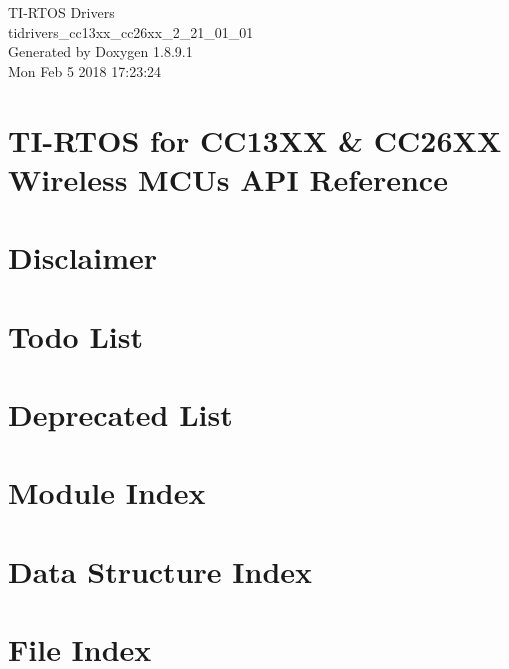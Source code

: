 \documentclass[twoside]{article}
\newcommand{\+}{\discretionary{\mbox{\scriptsize$\hookleftarrow$}}{}{}}
\begin{document}
\begin{titlepage}
\vspace*{7cm}
\begin{center}%
{\Large T\+I-\/\+R\+T\+O\+S Drivers \\[1ex]\large tidrivers\+\_\+cc13xx\+\_\+cc26xx\+\_\+2\+\_\+21\+\_\+01\+\_\+01 }\\
\vspace*{1cm}
{\large Generated by Doxygen 1.8.9.1}\\
\vspace*{0.5cm}
{\small Mon Feb 5 2018 17:23:24}\\
\end{center}
\end{titlepage}
\tableofcontents
{}

\section{T\+I-\/\+R\+T\+O\+S for C\+C13\+X\+X \& C\+C26\+X\+X Wireless M\+C\+Us A\+P\+I Reference}
\label{index}\hypertarget{index}{}
\section{Disclaimer}
\label{_disclaimer}

\section{Todo List}
\label{todo}

\section{Deprecated List}
\label{deprecated}

\section{Module Index}

\section{Data Structure Index}

\section{File Index}

\end{document}
